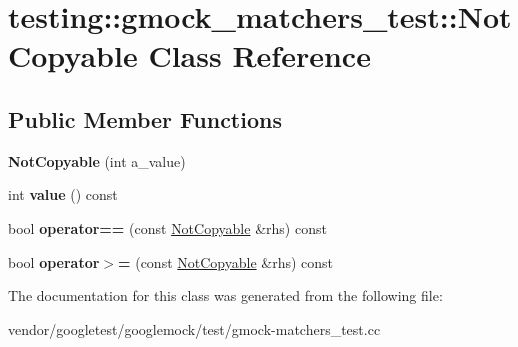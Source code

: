 \hypertarget{classtesting_1_1gmock__matchers__test_1_1_not_copyable}{}\section{testing\+:\+:gmock\+\_\+matchers\+\_\+test\+:\+:Not\+Copyable Class Reference}
\label{classtesting_1_1gmock__matchers__test_1_1_not_copyable}
\subsection*{Public Member Functions}
\begin{DoxyCompactItemize}
\item 
\mbox{\label{classtesting_1_1gmock__matchers__test_1_1_not_copyable_a3d15763c115415a26d8acc9ce5a26e19}} 
{\bfseries Not\+Copyable} (int a\+\_\+value)
\item 
\mbox{\label{classtesting_1_1gmock__matchers__test_1_1_not_copyable_af6c134767462948fa8dbd35c68370004}} 
int {\bfseries value} () const
\item 
\mbox{\label{classtesting_1_1gmock__matchers__test_1_1_not_copyable_a2e68fcd9a588a184d54e6b54e41fb978}} 
bool {\bfseries operator==} (const \hyperlink{classtesting_1_1gmock__matchers__test_1_1_not_copyable}{Not\+Copyable} \&rhs) const
\item 
\mbox{\label{classtesting_1_1gmock__matchers__test_1_1_not_copyable_a36eb6a25f5559bee00fe52a6d86b42d6}} 
bool {\bfseries operator$>$=} (const \hyperlink{classtesting_1_1gmock__matchers__test_1_1_not_copyable}{Not\+Copyable} \&rhs) const
\end{DoxyCompactItemize}


The documentation for this class was generated from the following file\+:\begin{DoxyCompactItemize}
\item 
vendor/googletest/googlemock/test/gmock-\/matchers\+\_\+test.\+cc\end{DoxyCompactItemize}
